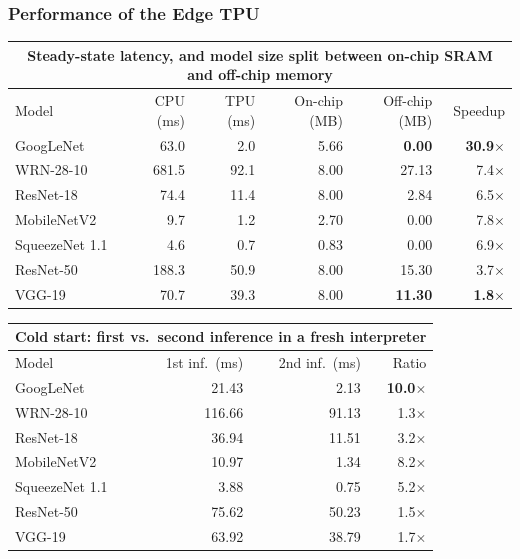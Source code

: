 
\newcommand{\tpuhi}[1]{{\color{red!65!black}\textbf{#1}}}

\begin{frame}
\frametitle{Performance of the Edge TPU}

\begin{center}
\setlength{\tabcolsep}{4pt}
\renewcommand{\arraystretch}{0.95}
{\tiny
\begin{tabular}{lrrrrr}
\toprule
\multicolumn{6}{c}{\textbf{Steady-state latency, and model size split between
on-chip SRAM and off-chip memory}}\\
\midrule
Model & CPU (ms) & TPU (ms) & On-chip (MB) & Off-chip (MB) & Speedup \\
\midrule
GoogLeNet      &  63.0 &  2.0 & 5.66 & \tpuhi{0.00}  & \tpuhi{30.9$\times$} \\
WRN-28-10      & 681.5 & 92.1 & 8.00 & 27.13 &  7.4$\times$ \\
ResNet-18      &  74.4 & 11.4 & 8.00 &  2.84 &  6.5$\times$ \\
MobileNetV2    &   9.7 &  1.2 & 2.70 &  0.00 &  7.8$\times$ \\
SqueezeNet 1.1 &   4.6 &  0.7 & 0.83 &  0.00 &  6.9$\times$ \\
ResNet-50      & 188.3 & 50.9 & 8.00 & 15.30 &  3.7$\times$ \\
VGG-19         &  70.7 & 39.3 & 8.00 & \tpuhi{11.30} & \tpuhi{1.8$\times$} \\
\bottomrule
\end{tabular}}

\vspace{0.35cm}

{\tiny
\begin{tabular}{lrrr}
\toprule
\multicolumn{4}{c}{\textbf{Cold start: first vs.\ second inference in a fresh
interpreter}}\\
\midrule
Model & 1st inf.\ (ms) & 2nd inf.\ (ms) & Ratio \\
\midrule
GoogLeNet      &  21.43 &  2.13 & \tpuhi{10.0$\times$} \\
WRN-28-10      & 116.66 & 91.13 &  1.3$\times$ \\
ResNet-18      &  36.94 & 11.51 &  3.2$\times$ \\
MobileNetV2    &  10.97 &  1.34 &  8.2$\times$ \\
SqueezeNet 1.1 &   3.88 &  0.75 &  5.2$\times$ \\
ResNet-50      &  75.62 & 50.23 &  1.5$\times$ \\
VGG-19         &  63.92 & 38.79 &  1.7$\times$ \\
\bottomrule
\end{tabular}}
\end{center}

\end{frame}

